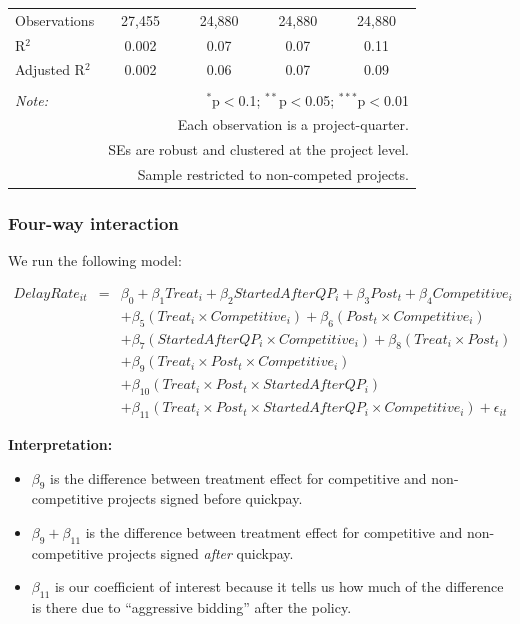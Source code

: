 \documentclass[
]{article}
\providecommand{\tightlist}{%
  \setlength{\itemsep}{0pt}\setlength{\parskip}{0pt}}
\begin{document}
\begin{table}[H]
\begin{tabular}{@{\extracolsep{-2pt}}lcccc}
Observations & 27,455 & 24,880 & 24,880 & 24,880 \\ 
R$^{2}$ & 0.002 & 0.07 & 0.07 & 0.11 \\ 
Adjusted R$^{2}$ & 0.002 & 0.06 & 0.07 & 0.09 \\ 
\hline 
\hline \\[-1.8ex] 
\textit{Note:}  & \multicolumn{4}{r}{$^{*}$p$<$0.1; $^{**}$p$<$0.05; $^{***}$p$<$0.01} \\ 
 & \multicolumn{4}{r}{Each observation is a project-quarter.} \\ 
 & \multicolumn{4}{r}{SEs are robust and clustered at the project level.} \\ 
 & \multicolumn{4}{r}{Sample restricted to non-competed projects.} \\ 
\end{tabular} 
\end{table}

\hypertarget{four-way-interaction}{%
\subsubsection{Four-way interaction}\label{four-way-interaction}}

We run the following model:

\[\begin{aligned} DelayRate_{it} &=& \beta_0 +\beta_1 Treat_i+ \beta_2 StartedAfterQP_i+ \beta_3 Post_t+ \beta_4 Competitive_i\\ && +  \beta_5 (Treat_i \times Competitive_i) + \beta_6 (Post_t \times Competitive_i)\\ && +  \beta_7 (StartedAfterQP_i \times Competitive_i) +\beta_8 (Treat_i \times Post_t)\\ && + \beta_9 (Treat_i \times Post_t \times Competitive_i) \\ && + \beta_{10} (Treat_i \times Post_t \times StartedAfterQP_i )\\ && + \beta_{11} (Treat_i \times Post_t \times StartedAfterQP_i \times Competitive_i) + \epsilon_{it} \end{aligned}\]

\textbf{Interpretation:}

\begin{itemize}
\tightlist
\item
  \(\beta_9\) is the difference between treatment effect for competitive
  and non-competitive projects signed before quickpay.
\item
  \(\beta_9 + \beta_{11}\) is the difference between treatment effect
  for competitive and non-competitive projects signed \emph{after}
  quickpay.
\item
  \(\beta_{11}\) is our coefficient of interest because it tells us how
  much of the difference is there due to ``aggressive bidding'' after
  the policy.
\end{itemize}
\end{document}
